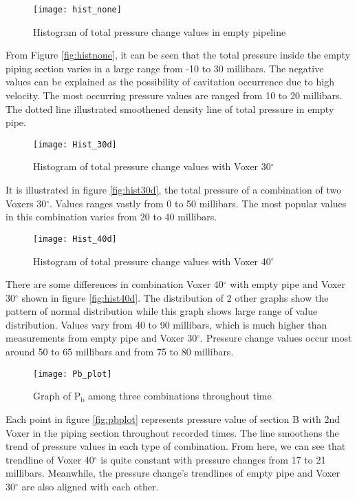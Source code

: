 \begin{figure}[h]
  \centering
  \texttt{[image: hist\_none]}
  \caption{ Histogram of total pressure change values in empty pipeline}
  \label{fig:histnone}
\end{figure}

From Figure \vref{fig:histnone}, it can be seen that the total pressure inside the empty piping section varies in a large range from -10 to 30 millibars. The negative values can be explained as the possibility of cavitation occurrence due to high velocity. The most occurring pressure values are ranged from 10 to 20 millibars. The dotted line illustrated smoothened density line of total pressure in empty pipe. 

\begin{figure}[h]
  \centering
  \texttt{[image: Hist\_30d]}
  \caption{ Histogram of total pressure change values with Voxer 30$^{\circ}$}
  \label{fig:hist30d}
\end{figure}

It is illustrated in figure \vref{fig:hist30d}, the total pressure of a combination of two Voxers 30$^{\circ}$. Values ranges vastly from 0 to 50 millibars. The most popular values in this combination varies from 20 to 40 millibars.

\begin{figure}[h]
  \centering
  \texttt{[image: Hist\_40d]}
  \caption{ Histogram of total pressure change values  with Voxer 40$^{\circ}$}
  \label{fig:hist40d}
\end{figure}

There are some differences in combination Voxer 40$^{\circ}$ with empty pipe and Voxer 30$^{\circ}$ shown in figure \vref{fig:hist40d}. The distribution of 2 other graphs show the pattern of normal distribution while this graph shows large range of value distribution. Values vary from 40 to 90 millibars, which is much higher than measurements from empty pipe and Voxer 30$^{\circ}$. Pressure change values occur most around 50 to 65 millibars and from 75 to 80 millibars. 

\begin{figure}[h]
  \centering
  \texttt{[image: Pb\_plot]}
  \caption{ Graph of P$_{\text{b}}$ among three combinations throughout time}
  \label{fig:pbplot}
\end{figure}

Each point in figure \vref{fig:pbplot} represents pressure value of section B with 2nd Voxer in the piping section throughout recorded times. The line smoothens the trend of pressure values in each type of combination. From here, we can see that trendline of Voxer 40$^{\circ}$ is quite constant with pressure changes from 17 to 21 millibars. Meanwhile, the pressure change's trendlines of empty pipe and Voxer 30$^{\circ}$ are also aligned with each other. 

